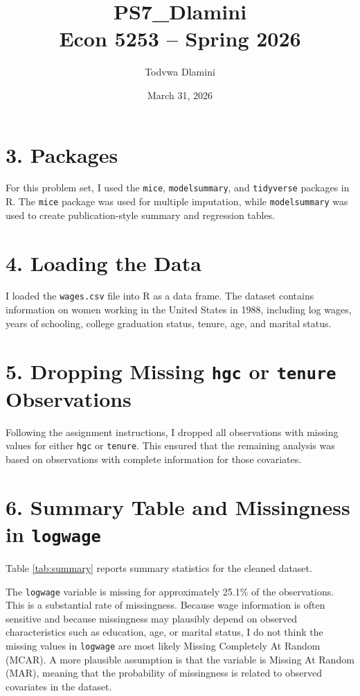 \documentclass[12pt]{article}
\title{PS7\_Dlamini\\
\large Econ 5253 -- Spring 2026}
\author{Todvwa Dlamini}
\date{March 31, 2026}
\begin{document}
\maketitle

\section*{3. Packages}
For this problem set, I used the \texttt{mice}, \texttt{modelsummary}, and \texttt{tidyverse} packages in R. The \texttt{mice} package was used for multiple imputation, while \texttt{modelsummary} was used to create publication-style summary and regression tables.

\section*{4. Loading the Data}
I loaded the \texttt{wages.csv} file into R as a data frame. The dataset contains information on women working in the United States in 1988, including log wages, years of schooling, college graduation status, tenure, age, and marital status.

\section*{5. Dropping Missing \texttt{hgc} or \texttt{tenure} Observations}
Following the assignment instructions, I dropped all observations with missing values for either \texttt{hgc} or \texttt{tenure}. This ensured that the remaining analysis was based on observations with complete information for those covariates.

\section*{6. Summary Table and Missingness in \texttt{logwage}}
Table \ref{tab:summary} reports summary statistics for the cleaned dataset.

\begin{table}[H]
\centering
\caption{Summary Statistics for the Cleaned Wages Data}
\label{tab:summary}

\end{table}

The \texttt{logwage} variable is missing for approximately 25.1\% of the observations. This is a substantial rate of missingness. Because wage information is often sensitive and because missingness may plausibly depend on observed characteristics such as education, age, or marital status, I do not think the missing values in \texttt{logwage} are most likely Missing Completely At Random (MCAR). A more plausible assumption is that the variable is Missing At Random (MAR), meaning that the probability of missingness is related to observed covariates in the dataset.
\end{document}
